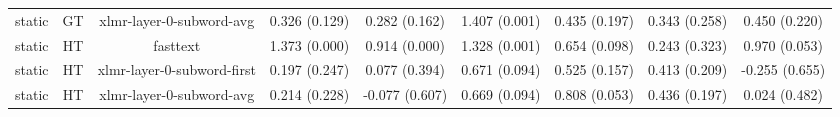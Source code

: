 \begin{sidewaystable}[htb]
\begin{tabular}{@{}ccccccccc@{}}
        static & GT & xlmr-layer-0-subword-avg & 0.326 (0.129) & 0.282 (0.162) & 1.407 (0.001) & 0.435 (0.197) & 0.343 (0.258) & 0.450 (0.220) \\
        static & HT & fasttext & 1.373 (0.000) & 0.914 (0.000) & 1.328 (0.001) & 0.654 (0.098) & 0.243 (0.323) & 0.970 (0.053) \\
        static & HT & xlmr-layer-0-subword-first & 0.197 (0.247) & 0.077 (0.394) & 0.671 (0.094) & 0.525 (0.157) & 0.413 (0.209) & -0.255 (0.655) \\
        static & HT & xlmr-layer-0-subword-avg & 0.214 (0.228) & -0.077 (0.607) & 0.669 (0.094) & 0.808 (0.053) & 0.436 (0.197) & 0.024 (0.482) \\
        \bottomrule
    \end{tabular}
\end{sidewaystable}